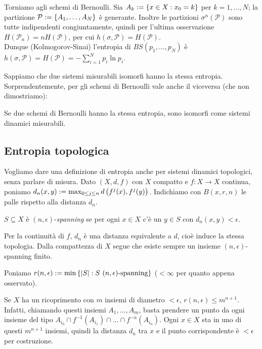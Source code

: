 Torniamo agli schemi di Bernoulli.
Sia $A_k:=\left\{x\in X:x_0=k\right\}$ per $k=1,\dots,N$; la partizione $\mathcal{P}:=\left\{A_1,\dots,A_N\right\}$ è generante.
Inoltre le partizioni $\sigma^n(\mathcal{P})$ sono tutte indipendenti congiuntamente, quindi per l'ultima osservazione
$H(\mathcal{P}_n)=nH(\mathcal{P})$, per cui $h(\sigma,\mathcal{P})=H(\mathcal{P})$. \\
Dunque (Kolmogorov-Sinai) l'entropia di $BS(p_1,\dots,p_N)$ è $h(\sigma,\mathcal{P})=H(\mathcal{P})=-\sum_{i=1}^N p_i\ln p_i$.

Sappiamo che due sistemi misurabili isomorfi hanno la stessa entropia. Sorprendentemente, per gli schemi di Bernoulli vale anche il viceversa
(che non dimostriamo):

\begin{teo}[Ornstein]Se due schemi di Bernoulli hanno la stessa entropia, sono isomorfi come sistemi dinamici misurabili.
\end{teo}

\subsection{Entropia topologica}

Vogliamo dare una definizione di entropia anche per sistemi dinamici topologici, senza parlare di misura.
Dato $(X,d,f)$ con $X$ compatto e $f:X\to X$ continua, poniamo $d_n(x,y):=\max_{0\le j\le n}d\left(f^j(x),f^j(y)\right)$.
Indichiamo con $B(x,r,n)$ le palle rispetto alla distanza $d_n$.

\begin{defi}$S\subseteq X$ è $(n,\epsilon)$-\emph{spanning} se per ogni $x\in X$ c'è un $y\in S$
con $d_n(x,y)<\epsilon$.
\end{defi}

\begin{oss}Per la continuità di $f$, $d_n$ è una distanza equivalente a $d$, cioè
induce la stessa topologia. Dalla compattezza di $X$ segue che esiste sempre un insieme $(n,\epsilon)$-spanning finito.
\end{oss}

\begin{defi}Poniamo $r(n,\epsilon):=\min\set{\abs{S}:S\ (n,\epsilon)\text{-spanning}}$ ($<\infty$
per quanto appena osservato).
\end{defi}

\begin{oss}Se $X$ ha un ricoprimento con $m$ insiemi di diametro $<\epsilon$, $r(n,\epsilon)\le m^{n+1}$.
Infatti, chiamando questi insiemi $A_1,\dots,A_m$, basta prendere un punto da ogni insieme del tipo
$A_{i_0}\cap f^{-1}(A_{i_1})\cap\dots\cap f^{-n}(A_{i_n})$. Ogni $x\in X$ sta in uno di questi $m^{n+1}$ insiemi,
quindi la distanza $d_n$ tra $x$ e il punto corrispondente è $<\epsilon$ per costruzione.
\end{oss}

